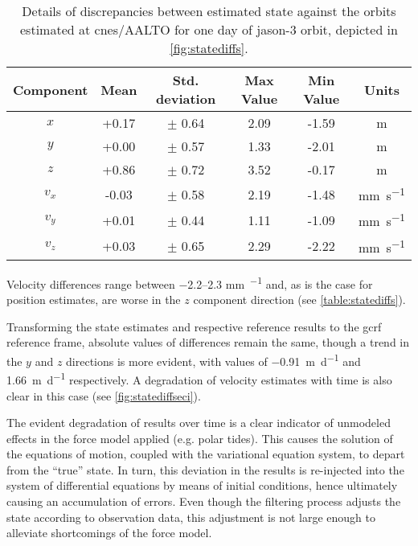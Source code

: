 \begin{table}[h!]
    \centering
    \begin{tabularx}{\textwidth}{cccccc}
        \toprule
        \textbf{Component} & \textbf{Mean} & \textbf{Std. deviation} & \textbf{Max Value} & \textbf{Min Value} & \textbf{Units}\\
        \hline
        $x$   &  +0.17 & $\pm$ 0.64 & 2.09 & -1.59 & \si{\metre}\\
        $y$   &  +0.00 & $\pm$ 0.57 & 1.33 & -2.01 & \si{\metre}\\
        $z$   &  +0.86 & $\pm$ 0.72 & 3.52 & -0.17 & \si{\metre}\\
        $v_x$ &  -0.03 & $\pm$ 0.58 & 2.19 & -1.48 & \si{\milli\metre\per\second}\\
        $v_y$ &  +0.01 & $\pm$ 0.44 & 1.11 & -1.09 & \si{\milli\metre\per\second}\\
        $v_z$ &  +0.03 & $\pm$ 0.65 & 2.29 & -2.22 & \si{\milli\metre\per\second}\\
       \bottomrule
    \end{tabularx}
    \caption{Details of discrepancies between estimated state against the orbits estimated at \gls{cnes}/AALTO for one day of \gls{jason}-3 orbit, depicted in \autoref{fig:statediffs}.}
    \label{table:statediffs}
\end{table}

Velocity differences range between \numrange{-2.2}{2.3} \si{\milli\metre\per\sec} and, as is the 
case for position estimates, are worse in the $z$ component direction (see 
\autoref{table:statediffs}).

Transforming the state estimates and respective reference results to the \gls{gcrf} 
reference frame, absolute values of differences remain the same, though a trend in 
the $y$ and $z$ directions is more evident, with values of \SI{-0.91}{\metre\per\day} 
and \SI{+1.66}{\metre\per\day} respectively. A degradation of velocity estimates with 
time is also clear in this case (see \autoref{fig:statediffseci}).

The evident degradation of results over time is a clear indicator of 
unmodeled effects in the force model applied (e.g. polar tides). This causes the solution of 
the equations of motion, coupled with the variational equation system, to depart from 
the ``true'' state. In turn, this deviation in the results is re-injected into the 
system of differential equations by means of initial conditions, hence ultimately causing an 
accumulation of errors. Even though the filtering process adjusts the state according to 
observation data, this adjustment is not large enough to alleviate shortcomings of the 
force model.

